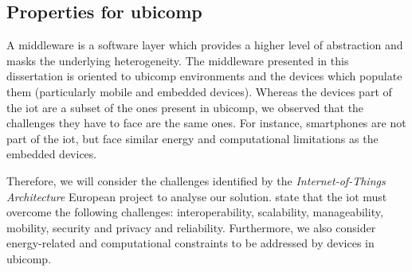 


\subsection{Properties for \acs{ubicomp}}
\label{sec:middleware_properties}

A middleware is a software layer which provides a higher level of abstraction and masks the underlying heterogeneity.
The middleware presented in this dissertation is oriented to \ac{ubicomp} environments and the devices which populate them (particularly mobile and embedded devices).
Whereas the devices part of the \ac{iot} are a subset of the ones present in \ac{ubicomp}, we observed that the challenges they have to face are the same ones.
For instance, smartphones are not part of the \ac{iot}, but face similar energy and computational limitations as the embedded devices. %

Therefore, we will consider the challenges identified by the \emph{Internet-of-Things Architecture} European project \citep{walewski_project_2011} to analyse our solution.
\citeauthor{walewski_project_2011} state that the \ac{iot} must overcome the following challenges:
interoperability, scalability, manageability, mobility, security and privacy and reliability.
Furthermore, we also consider energy-related and computational constraints to be addressed by devices in \ac{ubicomp}. %


